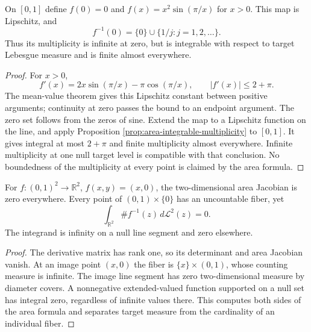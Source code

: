 \begin{example}\label{ex:area-infinite-exceptional-fiber}
On $[0,1]$ define $f(0)=0$ and $f(x)=x^2\sin(\pi/x)$ for $x>0$. This map is Lipschitz, and
\[
 f^{-1}(0)=\{0\}\cup\{1/j:j=1,2,\ldots\}.
\]
Thus its multiplicity is infinite at zero, but is integrable with respect to target Lebesgue measure and is finite almost everywhere.
\end{example}
\begin{proof}
For $x>0$,
\[
 f'(x)=2x\sin(\pi/x)-\pi\cos(\pi/x),
 \qquad |f'(x)|\leq2+\pi.
\]
The mean-value theorem gives this Lipschitz constant between positive arguments; continuity at zero passes the bound to an endpoint argument. The zero set follows from the zeros of sine. Extend the map to a Lipschitz function on the line, and apply Proposition \ref{prop:area-integrable-multiplicity} to $[0,1]$. It gives integral at most $2+\pi$ and finite multiplicity almost everywhere. Infinite multiplicity at one null target level is compatible with that conclusion. No boundedness of the multiplicity at every point is claimed by the area formula.
\end{proof}

\begin{example}\label{ex:area-projection-infinite-fibers}
For $f:(0,1)^2\to\mathbb R^2$, $f(x,y)=(x,0)$, the two-dimensional area Jacobian is zero everywhere. Every point of $(0,1)\times\{0\}$ has an uncountable fiber, yet
\[
 \int_{\mathbb R^2}\#f^{-1}(z)\,d\mathcal L^2(z)=0.
\]
The integrand is infinity on a null line segment and zero elsewhere.
\end{example}
\begin{proof}
The derivative matrix has rank one, so its determinant and area Jacobian vanish. At an image point $(x,0)$ the fiber is $\{x\}\times(0,1)$, whose counting measure is infinite. The image line segment has zero two-dimensional measure by diameter covers. A nonnegative extended-valued function supported on a null set has integral zero, regardless of infinite values there. This computes both sides of the area formula and separates target measure from the cardinality of an individual fiber.
\end{proof}


